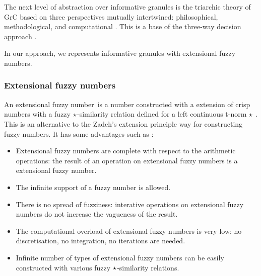 \documentclass{amcs}
\newcommand{\efn}{extensional fuzzy number}
\newcommand{\Efn}{Extensional fuzzy number}
\begin{document}
The next level of abstraction over informative granules is the triarchic theory of GrC based on three perspectives mutually intertwined:
philosophical, methodological, and computational  \cite{id:Yao2016triarchic}.
This is a base of the three-way decision approach \cite{id:Yao2009Three,id:Yao2011Superiority,id:Siminski20233WDNFS,id:Ptas2026Art,id:Siminski2026Towards}.

In our approach, we represents informative granules with \efn s.
 

\subsubsection{\Efn s}


An \efn\ is a number constructed with a extension of crisp numbers with a fuzzy $\operatorname*{\star}$-similarity
relation deﬁned for a left continuous t-norm $\operatorname*{\star}$
\cite{id:Holcapek2012Arithmethics-I,id:Holcapek2012Arithmethics-II,id:Holcapek2014MI-Algebras,id:Siminski2026Arithmetic}.
This is an alternative to the Zadeh's extension principle \cite{id:Zadeh1965FuzzySets} way for constructing fuzzy numbers. 
It has some advantages such as \cite{id:Siminski2026Arithmetic}: 
\begin{itemize}
   \item \Efn s are complete with respect to the arithmetic operations: the result of an operation on \efn s is a \efn.
   \item The infinite support of a fuzzy number is allowed.
   \item There is no spread of fuzziness: interative operations on \efn s do not increase the vagueness of the result. 
   \item The computational overload of extensional fuzzy numbers is very low: no discretisation, no integration, no iterations are needed.
   \item Infinite number of types of \efn s can be easily constructed with various fuzzy $\operatorname*{\star}$-similarity relations.
\end{itemize}
\end{document}

